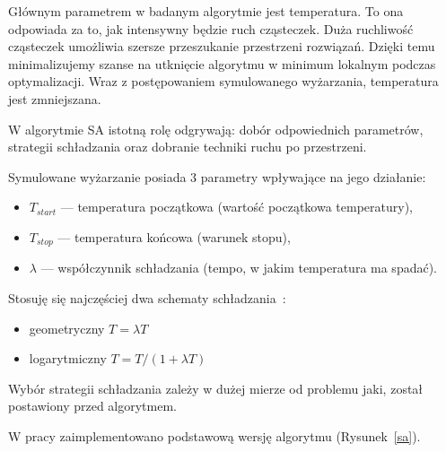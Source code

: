Głównym parametrem w badanym algorytmie jest temperatura. To ona odpowiada za to, jak intensywny będzie ruch cząsteczek. Duża ruchliwość cząsteczek umożliwia szersze przeszukanie przestrzeni rozwiązań. Dzięki temu minimalizujemy szanse na utknięcie algorytmu w minimum lokalnym podczas optymalizacji. Wraz z postępowaniem symulowanego wyżarzania, temperatura jest zmniejszana.

W algorytmie SA istotną rolę odgrywają: dobór odpowiednich parametrów, strategii schładzania oraz dobranie techniki ruchu po przestrzeni.

\breakparagraph{}
Symulowane wyżarzanie posiada 3 parametry wpływające na jego działanie:
\begin{itemize}
	\item $T_{start}$ --- temperatura początkowa (wartość początkowa temperatury),
	\item $T_{stop}$ --- temperatura końcowa (warunek stopu),
	\item $\lambda$ --- współczynnik schładzania (tempo, w jakim temperatura ma spadać).
\end{itemize}

\breakparagraph{}
Stosuję się najczęściej dwa schematy schładzania~\cite{Smutnicki2002As}:
\begin{itemize}
	\item geometryczny $T = \lambda T$
	\item logarytmiczny $T = T /(1 + \lambda T)$
\end{itemize}

Wybór strategii schładzania zależy w dużej mierze od problemu jaki, został postawiony przed algorytmem.

\breakparagraph{}
W pracy zaimplementowano podstawową wersję algorytmu (Rysunek~\ref{sa}).
\raggedbottom


